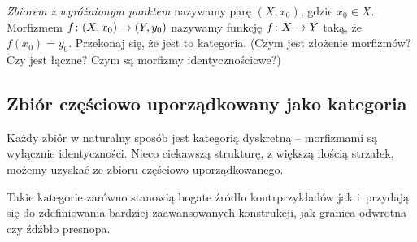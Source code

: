 
\begin{exc}
  \emph{Zbiorem z wyróżnionym punktem} nazywamy parę $(X, x_0)$, gdzie $x_0\in X$. Morfizmem $f\colon (X, x_0)\to (Y, y_0)$ nazywamy funkcję $f\colon X\to Y$ taką, że $f(x_0)=y_0$. Przekonaj się, że jest to kategoria. (Czym jest złożenie morfizmów? Czy jest łączne? Czym są morfizmy identycznościowe?)
\end{exc}

\subsection{Zbiór częściowo uporządkowany jako kategoria}
\begin{idea}
  Każdy zbiór w naturalny sposób jest kategorią dyskretną -- morfizmami są wyłącznie identyczności. Nieco ciekawszą strukturę, z większą ilością strzałek, możemy uzyskać ze zbioru częściowo uporządkowanego.

  Takie kategorie zarówno stanowią bogate źródło kontrprzykładów jak i~przydają się do zdefiniowania bardziej zaawansowanych konstrukcji, jak granica odwrotna czy źdźbło presnopa.
\end{idea}

